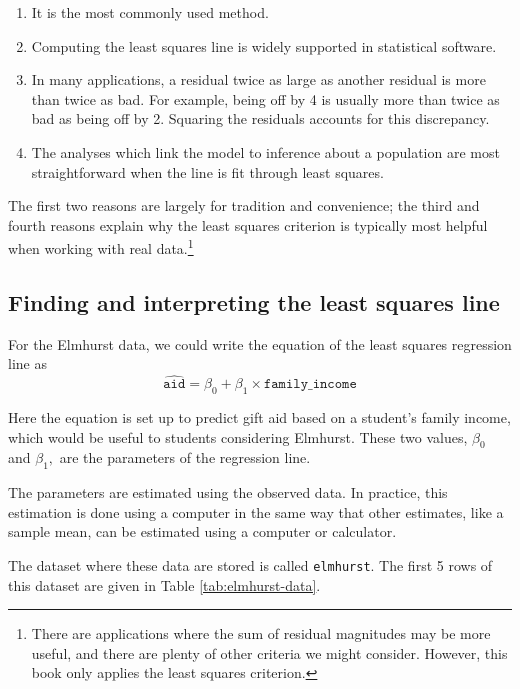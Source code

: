 \documentclass[
  10pt,
  openany]{book}
\providecommand{\tightlist}{%
  \setlength{\itemsep}{0pt}\setlength{\parskip}{0pt}}
\begin{document}
\begin{enumerate}
\def\labelenumi{\arabic{enumi}.}
\tightlist
\item
  It is the most commonly used method.
\item
  Computing the least squares line is widely supported in statistical software.
\item
  In many applications, a residual twice as large as another residual is more than twice as bad. For example, being off by 4 is usually more than twice as bad as being off by 2. Squaring the residuals accounts for this discrepancy.
\item
  The analyses which link the model to inference about a population are most straightforward when the line is fit through least squares.
\end{enumerate}

The first two reasons are largely for tradition and convenience; the third and fourth reasons explain why the least squares criterion is typically most helpful when working with real data.\footnote{There are applications where the sum of residual magnitudes may be more useful, and there are plenty of other criteria we might consider.
  However, this book only applies the least squares criterion.}

\hypertarget{finding-and-interpreting-the-least-squares-line}{%
\subsection{Finding and interpreting the least squares line}\label{finding-and-interpreting-the-least-squares-line}}

For the Elmhurst data, we could write the equation of the least squares regression line as \[\widehat{\texttt{aid}} = \beta_0 + \beta_{1}\times \texttt{family_income}\]

Here the equation is set up to predict gift aid based on a student's family income, which would be useful to students considering Elmhurst.
These two values, \(\beta_0\) and \(\beta_1,\) are the parameters of the regression line.

The parameters are estimated using the observed data.
In practice, this estimation is done using a computer in the same way that other estimates, like a sample mean, can be estimated using a computer or calculator.

The dataset where these data are stored is called \texttt{elmhurst}.
The first 5 rows of this dataset are given in Table \ref{tab:elmhurst-data}.
\end{document}
